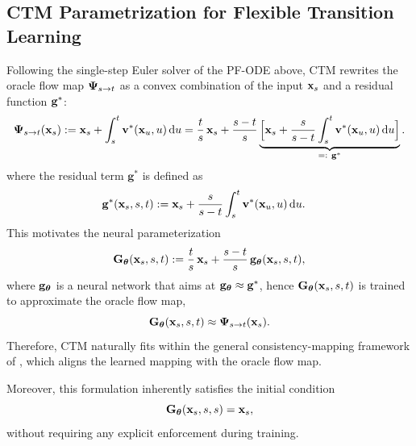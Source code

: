 \subsection{CTM Parametrization for Flexible Transition Learning}
Following the single-step Euler solver of the PF-ODE above, 
CTM rewrites the oracle flow map ${\bm{\Psi}}_{s\to t}$ 
as a convex combination of the input ${\mathbf{x}}_s$ and a residual function ${\mathbf{g}}^*$:
\begin{align*}
{\bm{\Psi}}_{s\to t}({\mathbf{x}}_s)
:= {\mathbf{x}}_s + \int_s^t {\mathbf{v}}^*({\mathbf{x}}_u,u) \mathop{}\!\mathrm{d} u 
= \frac{t}{s}\,{\mathbf{x}}_s
+ \frac{s-t}{s}
\underbrace{\Big[{\mathbf{x}}_s + \frac{s}{s-t} \int_s^t {\mathbf{v}}^*({\mathbf{x}}_u,u) \mathop{}\!\mathrm{d} u\Big]}_{=:~{\mathbf{g}}^*}.
\end{align*}
where the residual term $\mathbf{g}^*$ is defined as
\begin{align}\label{eq:ctm-g-oracle}
\mathbf{g}^*(\mathbf{x}_{s}, s, t) &:= {\mathbf{x}}_s + \frac{s}{s-t} \int_s^t {\mathbf{v}}^*({\mathbf{x}}_u,u)\mathop{}\!\mathrm{d} u.
\end{align}
This motivates the neural parameterization
\begin{align}\label{eq:ctm_para_1}
    {\mathbf{G}}_{{\bm{\theta}}}({\mathbf{x}}_s,s,t)
:= \frac{t}{s}\,{\mathbf{x}}_s + \frac{s-t}{s}\,{\mathbf{g}}_{{\bm{\theta}}}({\mathbf{x}}_s,s,t),
\end{align}
where ${\mathbf{g}}_{{\bm{\theta}}}$ is a neural network that aims at ${\mathbf{g}}_{{\bm{\theta}}} \approx {\mathbf{g}}^*$, 
hence ${\mathbf{G}}_{{\bm{\theta}}}({\mathbf{x}}_s,s,t)$ is trained to approximate the oracle flow map,
\[
{\mathbf{G}}_{{\bm{\theta}}}({\mathbf{x}}_s,s,t) \approx {\bm{\Psi}}_{s\to t}({\mathbf{x}}_s).
\]
Therefore, CTM naturally fits within the general consistency-mapping framework of  
, which aligns the learned mapping with the oracle flow map.

Moreover, this formulation inherently satisfies the initial condition
\[
{\mathbf{G}}_{{\bm{\theta}}}({\mathbf{x}}_s,s,s)={\mathbf{x}}_s,
\]
without requiring any explicit enforcement during training.






